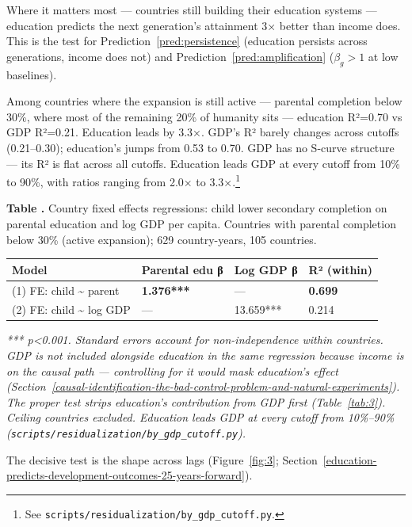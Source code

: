 \documentclass[12pt,letterpaper]{article}
\begin{document}
Where it matters most --- countries still building their education systems --- education predicts the next generation's attainment 3× better than income does. This is the test for Prediction~\ref{pred:persistence} (education persists across generations, income does not) and Prediction~\ref{pred:amplification} ($\beta_g > 1$ at low baselines).

Among countries where the expansion is still active --- parental
completion below 30\%, where most of the remaining 20\% of humanity sits
--- education R²=0.70 vs GDP R²=0.21. Education leads by 3.3×. GDP's R²
barely changes across cutoffs (0.21--0.30); education's jumps from 0.53
to 0.70. GDP has no S-curve structure --- its R² is flat across all
cutoffs. Education leads GDP at every cutoff from 10\% to 90\%, with ratios
ranging from 2.0× to 3.3×.\footnote{See
\texttt{scripts/residualization/by\_gdp\_cutoff.py}.}

\label{tab:1}\textbf{Table \thetable.} Country fixed effects regressions: child lower
secondary completion on parental education and log GDP per capita.
Countries with parental completion below 30\% (active expansion); 629
country-years, 105 countries.

\begin{longtable}[]{@{}llll@{}}
\toprule
Model & Parental edu β & Log GDP β & R² (within) \\
\midrule
\endhead
(1) FE: child \textasciitilde{} parent & \textbf{1.376***} & --- &
\textbf{0.699} \\
(2) FE: child \textasciitilde{} log GDP & --- & 13.659*** & 0.214 \\
\bottomrule
\end{longtable}

\emph{*** p\textless0.001. Standard errors account for non-independence
within countries. GDP is not included alongside education in the same
regression because income is on the causal path --- controlling for it
would mask education's effect (Section~\ref{causal-identification-the-bad-control-problem-and-natural-experiments}).
The proper test strips education's contribution from GDP first
(Table~\ref{tab:3}). Ceiling countries excluded. Education leads GDP at
every cutoff from 10\%--90\%
(\texttt{scripts/residualization/by\_gdp\_cutoff.py}).}

The decisive test is the shape across lags (Figure~\ref{fig:3}; Section~\ref{education-predicts-development-outcomes-25-years-forward}).
\end{document}

